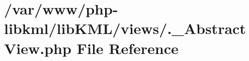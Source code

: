 \hypertarget{_8__AbstractView_8php}{
\section{/var/www/php-\/libkml/libKML/views/.\_\-AbstractView.php File Reference}
\label{da/d55/_8__AbstractView_8php}
}
